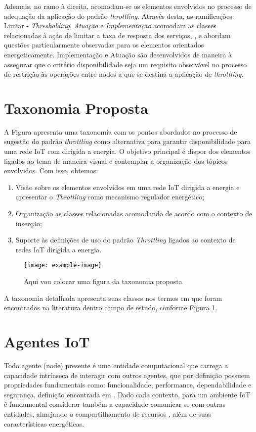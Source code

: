 Ademais, no ramo à direita, acomodam-se os elementos envolvidos no processo de adequação da aplicação do padrão \textit{throttling}. Através desta, as ramificações: Limiar - \textit{Thresholding}, \textit{Atuação} e \textit{Implementação} acomodam as classes relacionadas à ação de limitar a taxa de resposta dos serviços,  \cite{khairnar_discrete-rate_2015}, \cite{khan_energy_2015} e \cite{sudevalayam_energy_2011} abordam questões particularmente observadas para os elementos orientados energeticamente. Implementação e Atuação são desenvolvidos de maneira à assegurar que o critério disponibilidade seja um requisito observável no processo de restrição às operações entre nodes a que se destina a aplicação de \textit{throttling}.

\section{Taxonomia Proposta}
A Figura apresenta uma taxonomia com os pontos abordados no processo de sugestão do padrão \textit{throttling} como alternativa para garantir disponibilidade para uma rede IoT com dirigida a energia. O objetivo principal é dispor dos elementos ligados ao tema de maneira visual e contemplar a organização dos tópicos envolvidos. Com isso, obtemos:

\begin{enumerate}
    \item Visão sobre os elementos envolvidos em uma rede \acs{IoT} dirigida a energia e apresentar o \textit{Throttling} como mecanismo regulador energético;
    \item Organização as classes relacionadas acomodando de acordo com o contexto de inserção;
    \item Suporte às definições de uso do padrão \textit{Throttling} ligados ao contexto de redes \acs{IoT} dirigida a energia. 
\end{enumerate}

\begin{figure}[h]
\noindent\texttt{[image: example-image]} 
\caption{Aqui vou colocar uma figura da taxonomia proposta}
\label{fig:taxonomia_detalhada}
\centering
\end{figure}

A taxonomia detalhada apresenta suas classes nos termos em que foram encontrados na literatura dentro campo de estudo, conforme Figura \ref{fig:taxonomia_detalhada}.

\section{Agentes \acs{IoT}}
Todo agente (node) presente é uma entidade computacional que carrega a capacidade intrínseca de interagir com outros agentes, que por definição possuem propriedades fundamentais como: funcionalidade, performance, dependabilidade e segurança, definição encontrada em \cite{avizienis_basic_2004}. Dado cada contexto, para um ambiente IoT é fundamental considerar também a capacidade comunicar-se com outras entidades, almejando o compartilhamento de recursos \cite{li_internet_2015}, além de suas características energéticas. 


